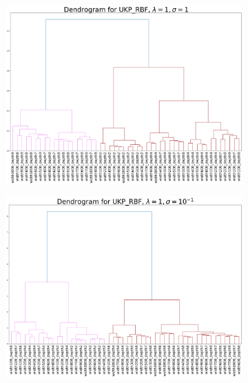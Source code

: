 \documentclass{article}
\theoremstyle{plain}
\begin{document}
\begin{figure}[!h]
    \centering
    \begin{subfigure}[b]{0.45\textwidth}
        \includegraphics[width=\textwidth]{Appendix figures/mnist_experiments/Dendogram/Dendogram for UKP_dist_RBF_1.000000e+00_1.000000e+00.png}
    \end{subfigure}
    \hfill
    \begin{subfigure}[b]{0.45\textwidth}
        \includegraphics[width=\textwidth]{Appendix figures/mnist_experiments/Dendogram/Dendogram for UKP_dist_RBF_1.000000e+00_1.000000e-01.png}
    \end{subfigure}
    
    \vspace{0.5cm}  %
    

\end{figure}
\end{document}
